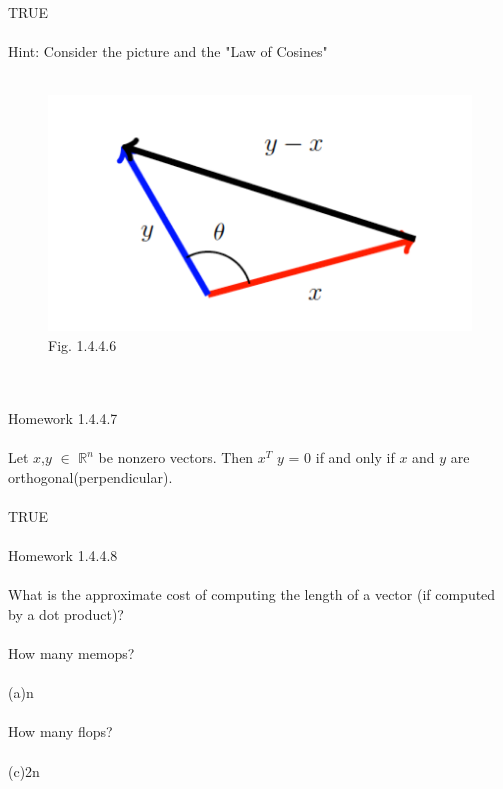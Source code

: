 \documentclass[11pt]{article}
\begin{document}
\\
TRUE
\\
\\
Hint: Consider the picture and the "Law of Cosines"
\\
\\
\begin{figure}
  \includegraphics[width=\linewidth]{HW_2.png}
  \caption{Fig. 1.4.4.6}
  \label{Fig.1.4.4.6}
\end{figure}
\\
\\
\newpage
Homework 1.4.4.7
\\
\\
Let $x$,$y$ $\in$ $\mathbb{R}^n$ be nonzero vectors. Then $x^{T}$ $y$ = 0 if and only if $x$ and $y$ are orthogonal(perpendicular).
\\
\\
TRUE
\\
\\
Homework 1.4.4.8
\\
\\
What is the approximate cost of computing the length of a vector (if computed by a dot product)?
\\
\\
How many memops?
\\
\\
(a)n
\\
\\
How many flops?
\\
\\
(c)2n
\end{document}
